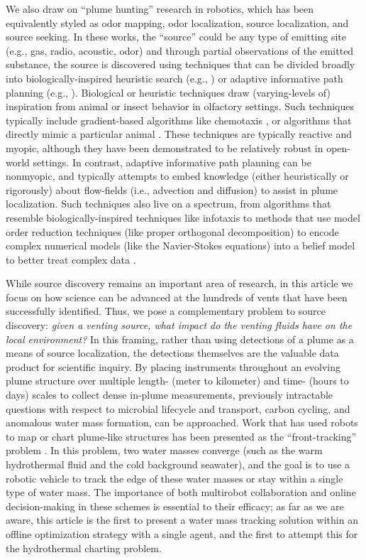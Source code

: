 We also draw on ``plume hunting'' research in robotics, which has been equivalently styled as odor mapping, odor localization, source localization, and source seeking. In these works, the ``source'' could be any type of emitting site (e.g., gas, radio, acoustic, odor) and through partial observations of the emitted substance, the source is discovered using techniques that can be divided broadly into biologically-inspired heuristic search (e.g., \cite{reddy2022olfactory,chen2019odor}) or adaptive informative path planning (e.g., \cite{salam2019adaptive}). Biological or heuristic techniques draw (varying-levels of) inspiration from animal or insect behavior in olfactory settings. Such techniques typically include gradient-based algorithms like chemotaxis \cite{morse1998robust}, or algorithms that directly mimic a particular animal \cite{edwards2001representing}. These techniques are typically reactive and myopic, although they have been demonstrated to be relatively robust in open-world settings. In contrast, adaptive informative path planning can be nonmyopic, and typically attempts to embed knowledge (either heuristically or rigorously) about flow-fields (i.e., advection and diffusion) to assist in plume localization. Such techniques also live on a spectrum, from algorithms that resemble biologically-inspired techniques like infotaxis \cite{vergassola2007infotaxis} to methods that use model order reduction techniques (like proper orthogonal decomposition) to encode complex numerical models (like the Navier-Stokes equations) into a belief model to better treat complex data \cite{peng2014dynamic}.

While source discovery remains an important area of research, in this article we focus on how science can be advanced at the hundreds of vents that have been successfully identified. Thus, we pose a complementary problem to source discovery: \emph{given a venting source, what impact do the venting fluids have on the local environment?} In this framing, rather than using detections of a plume as a means of source localization, the detections themselves are the valuable data product for scientific inquiry. By placing instruments throughout an evolving plume structure over multiple length- (meter to kilometer) and time- (hours to days) scales to collect dense in-plume measurements, previously intractable questions with respect to microbial lifecycle and transport, carbon cycling, and anomalous water mass formation, can be approached. Work that has used robots to map or chart plume-like structures has been presented as the ``front-tracking'' problem \cite{li2014multi,chen2019odor}. In this problem, two water masses converge (such as the warm hydrothermal fluid and the cold background seawater), and the goal is to use a robotic vehicle to track the edge of these water masses or stay within a single type of water mass. The importance of both multirobot collaboration and online decision-making in these schemes is essential to their efficacy; as far as we are aware, this article is the first to present a water mass tracking solution within an offline optimization strategy with a single agent, and the first to attempt this for the hydrothermal charting problem.

